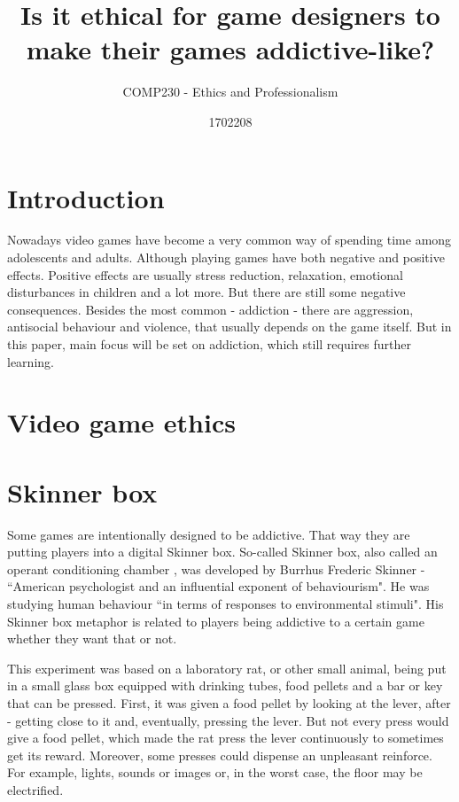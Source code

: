 \documentclass{scrartcl}
\title{Is it ethical for game designers to make their games addictive-like?}
\subtitle{COMP230 - Ethics and Professionalism}
\author{1702208}
\begin{document}
\maketitle

\section{Introduction}

Nowadays video games have become a very common way of spending time among adolescents and adults. Although playing games have both negative and positive effects. Positive effects are usually stress reduction\cite{russoniello2009effectiveness}, relaxation\cite{wack2009relationships}, emotional disturbances in children\cite{jones2014gaming}\cite{hull2009computer} and a lot more. But there are still some negative consequences. Besides the most common - addiction - there are aggression, antisocial behaviour and violence, that usually depends on the game itself. But in this paper, main focus will be set on addiction, which still requires further learning. 

\section{Video game ethics}

\section{Skinner box}

Some games are intentionally designed to be addictive. That way they are putting players into a digital Skinner box. So-called Skinner box, also called an operant conditioning chamber \cite{skinnerbox}, was developed by Burrhus Frederic Skinner - ``American psychologist and an influential exponent of behaviourism"\cite{bfskinner}. He was studying human behaviour ``in terms of responses to environmental stimuli"\cite{bfskinner}. His Skinner box metaphor is related to players being addictive to a certain game whether they want that or not\cite{creepyaddiction}. 

This experiment was based on a laboratory rat, or other small animal, being put in a small glass box equipped with drinking tubes, food pellets and a bar or key that can be pressed\cite{skinnerbox}\cite{nyskinnerbox}\cite{creepyaddiction}. First, it was given a food pellet by looking at the lever, after - getting close to it and, eventually, pressing the lever. But not every press would give a food pellet, which made the rat press the lever continuously to sometimes get its reward\cite{nyskinnerbox}. Moreover, some presses could dispense an unpleasant reinforce. For example, lights, sounds or images or, in the worst case, the floor may be electrified\cite{skinnerbox}.
\end{document}
